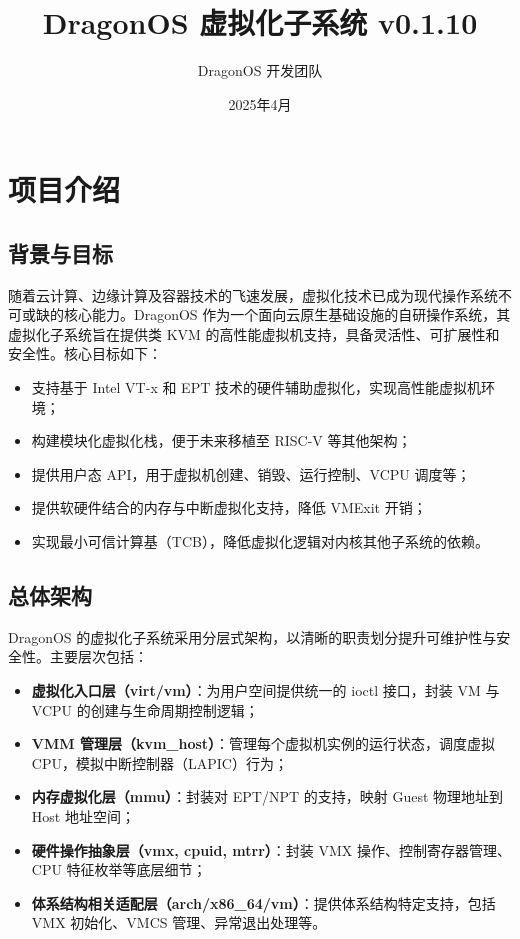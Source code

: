 \documentclass[analyze]{mancls}
\title{DragonOS 虚拟化子系统 v0.1.10}
\author{DragonOS 开发团队}
\date{2025年4月}
\begin{document}
\section{项目介绍}

\subsection{背景与目标}
随着云计算、边缘计算及容器技术的飞速发展，虚拟化技术已成为现代操作系统不可或缺的核心能力。DragonOS 作为一个面向云原生基础设施的自研操作系统，其虚拟化子系统旨在提供类 KVM 的高性能虚拟机支持，具备灵活性、可扩展性和安全性。核心目标如下：

\begin{itemize}
    \item 支持基于 Intel VT-x 和 EPT 技术的硬件辅助虚拟化，实现高性能虚拟机环境；
    \item 构建模块化虚拟化栈，便于未来移植至 RISC-V 等其他架构；
    \item 提供用户态 API，用于虚拟机创建、销毁、运行控制、VCPU 调度等；
    \item 提供软硬件结合的内存与中断虚拟化支持，降低 VMExit 开销；
    \item 实现最小可信计算基（TCB），降低虚拟化逻辑对内核其他子系统的依赖。
\end{itemize}

\subsection{总体架构}
DragonOS 的虚拟化子系统采用分层式架构，以清晰的职责划分提升可维护性与安全性。主要层次包括：

\begin{itemize}
    \item \textbf{虚拟化入口层（virt/vm）}：为用户空间提供统一的 ioctl 接口，封装 VM 与 VCPU 的创建与生命周期控制逻辑；
    \item \textbf{VMM 管理层（kvm\_host）}：管理每个虚拟机实例的运行状态，调度虚拟 CPU，模拟中断控制器（LAPIC）行为；
    \item \textbf{内存虚拟化层（mmu）}：封装对 EPT/NPT 的支持，映射 Guest 物理地址到 Host 地址空间；
    \item \textbf{硬件操作抽象层（vmx, cpuid, mtrr）}：封装 VMX 操作、控制寄存器管理、CPU 特征枚举等底层细节；
    \item \textbf{体系结构相关适配层（arch/x86\_64/vm）}：提供体系结构特定支持，包括 VMX 初始化、VMCS 管理、异常退出处理等。
\end{itemize}
\end{document}
